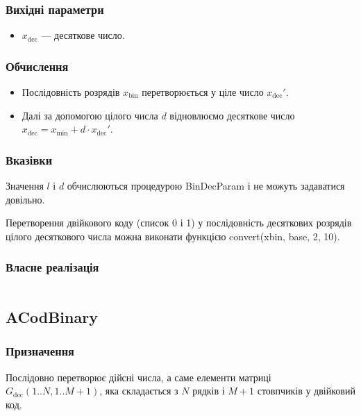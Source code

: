 \documentclass[a4paper, 12pt]{article}
\numberwithin{equation}{section}
\begin{document}
\subsubsection*{Вихідні параметри}

\begin{itemize}
    \item $x_{\text{dec}}$ --- десяткове число. 
\end{itemize}

\subsubsection*{Обчислення}

\begin{itemize}
    \item Послідовність розрядів $x_{\text{bin}}$ перетворюється у ціле число $x_{\text{dec}}'$. 
    \item Далі за допомогою цілого числа $d$ відновлюємо десяткове число $x_{\text{dec}} = x_{\text{min}} + d \cdot x_{\text{dec}}'$.
\end{itemize}

\subsubsection*{Вказівки}

Значення $l$ і $d$ обчислюються процедурою BinDecParam і не можуть задаватися довільно. \medskip

Перетворення двійкового коду (список 0 і 1) у послідовність десяткових розрядів цілого десяткового числа можна виконати функцією convert(xbin, base, 2, 10).

\subsubsection*{Власне реалізація}

\inputminted[firstline=9, lastline=24]{python}{../code/cod_decimal.py}

\subsection{ACodBinary}

\subsubsection*{Призначення}

Послідовно перетворює дійсні числа, а саме елементи матриці $G_{\text{dec}}(1..N,1..M+1)$, яка складається з $N$ рядків і $M + 1$ стовпчиків у двійковий код. \medskip
\end{document}
